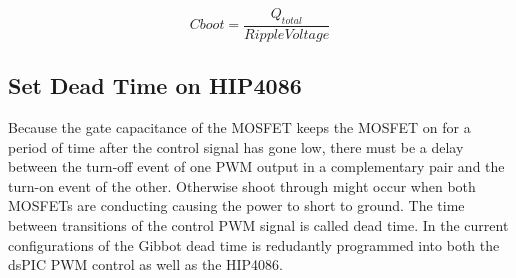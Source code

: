 \documentclass{article}
\begin{document}
\[Cboot = \frac{Q_{total}}{Ripple Voltage}\]

\subsection{Set Dead Time on HIP4086}
Because the gate capacitance of the MOSFET keeps the MOSFET on for a period of time after the control signal has gone low, there must be a delay between the turn-off event of one PWM
output in a complementary pair and the turn-on event of the other. Otherwise shoot through might occur when both MOSFETs are conducting causing the power to short to ground. The time between transitions of the control PWM signal is called dead time. In the current configurations of the Gibbot dead time is redudantly programmed into both the dsPIC PWM control as well as the HIP4086. 
\end{document}
